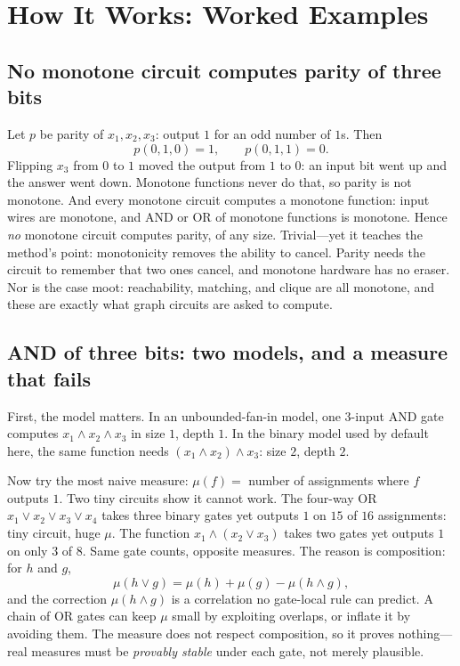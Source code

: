 \section{How It Works: Worked Examples}

\subsection{No monotone circuit computes parity of three bits}
Let $p$ be parity of $x_1,x_2,x_3$: output $1$ for an odd number of $1$s. Then
\[
p(0,1,0)=1,\qquad p(0,1,1)=0.
\]
Flipping $x_3$ from $0$ to $1$ moved the output from $1$ to $0$: an input bit went up and the answer went down. Monotone functions never do that, so parity is not monotone. And every monotone circuit computes a monotone function: input wires are monotone, and AND or OR of monotone functions is monotone. Hence \emph{no} monotone circuit computes parity, of any size. Trivial---yet it teaches the method's point: monotonicity removes the ability to cancel. Parity needs the circuit to remember that two ones cancel, and monotone hardware has no eraser. Nor is the case moot: reachability, matching, and clique are all monotone, and these are exactly what graph circuits are asked to compute.

\subsection{AND of three bits: two models, and a measure that fails}
First, the model matters. In an unbounded-fan-in model, one 3-input AND gate computes $x_1\wedge x_2\wedge x_3$ in size $1$, depth $1$. In the binary model used by default here, the same function needs $(x_1\wedge x_2)\wedge x_3$: size $2$, depth $2$.

Now try the most naive measure: $\mu(f)=$ number of assignments where $f$ outputs $1$. Two tiny circuits show it cannot work. The four-way OR $x_1\vee x_2\vee x_3\vee x_4$ takes three binary gates yet outputs $1$ on $15$ of $16$ assignments: tiny circuit, huge $\mu$. The function $x_1\wedge(x_2\vee x_3)$ takes two gates yet outputs $1$ on only $3$ of $8$. Same gate counts, opposite measures. The reason is composition: for $h$ and $g$,
\[
\mu(h\vee g)=\mu(h)+\mu(g)-\mu(h\wedge g),
\]
and the correction $\mu(h\wedge g)$ is a correlation no gate-local rule can predict. A chain of OR gates can keep $\mu$ small by exploiting overlaps, or inflate it by avoiding them. The measure does not respect composition, so it proves nothing---real measures must be \emph{provably stable} under each gate, not merely plausible.

